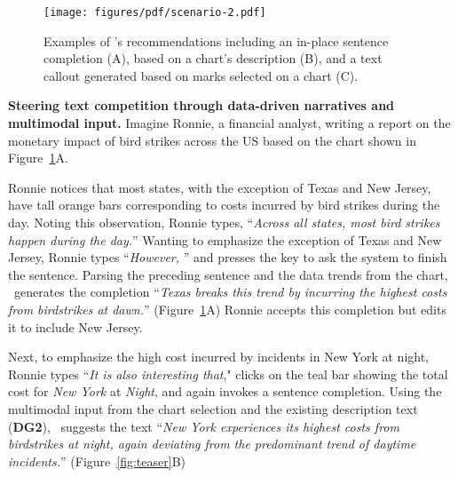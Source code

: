 \begin{figure}[t!]
    \centering
    \texttt{[image: figures/pdf/scenario-2.pdf]}
    \caption{Examples of \pluto's recommendations including an in-place sentence completion (A),  based on a chart's description (B), and a text callout generated based on marks selected on a chart (C).}
    \label{fig:scenario-2}
\end{figure}

\vspace{.5em}
\noindent\textbf{Steering text competition through data-driven narratives and multimodal input.}
Imagine Ronnie, a financial analyst, writing a report on the monetary impact of bird strikes across the US based on the chart shown in Figure~\ref{fig:scenario-2}A.

Ronnie notices that most states, with the exception of Texas and New Jersey, have tall orange bars corresponding to costs incurred by bird strikes during the day.
Noting this observation, Ronnie types, ``\textit{Across all states, most bird strikes happen during the day.}''
Wanting to emphasize the exception of Texas and New Jersey, Ronnie types ``\textit{However, }'' and presses the  key to ask the system to finish the sentence.
Parsing the preceding sentence and the data trends from the chart, \pluto~generates the completion ``\textit{Texas breaks this trend by incurring the highest costs from birdstrikes at dawn.}'' (Figure~\ref{fig:scenario-2}A)
Ronnie accepts this completion but edits it to include New Jersey.

Next, to emphasize the high cost incurred by incidents in New York at night, Ronnie types ``\textit{It is also interesting that}," clicks on the teal bar showing the total cost for \textit{New York} at \textit{Night}, and again invokes a sentence completion.
Using the multimodal input from the chart selection and the existing description text (\textbf{DG2}), \pluto~suggests the text ``\textit{New York experiences its highest costs from birdstrikes at night, again deviating from the predominant trend of daytime incidents.}'' (Figure~\ref{fig:teaser}B)

